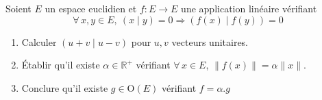 Soient $E$ un espace euclidien et $f: E \rightarrow E$ une application linéaire vérifiant
$$
\forall\, x, y \in E,\ (x \mid y)=0 \Rightarrow(f(x) \mid f(y))=0
$$

\begin{enumerate}
\item Calculer $(u+v \mid u-v)$ pour $u, v$ vecteurs unitaires.
\item Établir qu'il existe $\alpha \in \mathbb{R}^{+}$ vérifiant $\forall\, x \in E$, $\|f(x)\|=\alpha\|x\|$.
\item Conclure qu'il existe $g \in \mathrm O(E)$ vérifiant $f=\alpha . g$
\end{enumerate}

